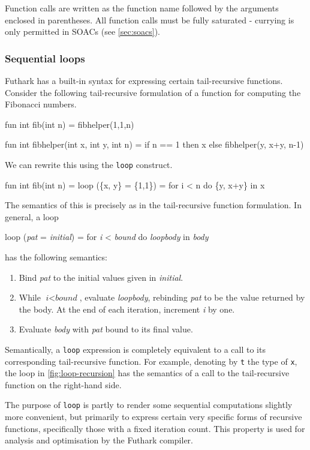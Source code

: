 \documentclass[oneside]{memoir}
\begin{document}
Function calls are written as the function name followed by the
arguments enclosed in parentheses.  All function calls must be fully
saturated - currying is only permitted in SOACs (see
\cref{sec:soacs}).

\subsubsection{Sequential loops}
\label{sec:sequential-loops}

Futhark has a built-in syntax for expressing certain tail-recursive
functions.  Consider the following tail-recursive formulation of a
function for computing the Fibonacci numbers.
\begin{colorcode}
  fun int fib(int n) = fibhelper(1,1,n)

  fun int fibhelper(int x, int y, int n) =
    if n == 1 then x else fibhelper(y, x+y, n-1)
\end{colorcode}
We can rewrite this using the \texttt{loop} construct.
\begin{colorcode}
  fun int fib(int n) =
    loop (\{x, y\} = \{1,1\}) = for i < n do
                              \{y, x+y\}
    in x
\end{colorcode}
The semantics of this is precisely as in the tail-recursive function
formulation.  In general, a loop
\begin{colorcode}
  loop (\emph{pat} = \emph{initial}) = for \emph{i} < \emph{bound} do \emph{loopbody}
  in \emph{body}
\end{colorcode}
has the following semantics:

\begin{enumerate}
  \item Bind \textit{pat} to the initial values given in \textit{initial}.
  \item While $\textit{i} < \textit{bound}$, evaluate
    \textit{loopbody}, rebinding \textit{pat} to be the value returned
    by the body.  At the end of each iteration, increment \textit{i}
    by one.
  \item Evaluate \textit{body} with \textit{pat} bound to its final
    value.
\end{enumerate}
Semantically, a \texttt{loop} expression is completely equivalent to a
call to its corresponding tail-recursive function.  For example,
denoting by \texttt{t} the type of \texttt{x}, the loop in
\cref{fig:loop-recursion} has the semantics of a call to the
tail-recursive function on the right-hand side.

The purpose of \texttt{loop} is partly to render some sequential
computations slightly more convenient, but primarily to express
certain very specific forms of recursive functions, specifically those
with a fixed iteration count.  This property is used for analysis and
optimisation by the Futhark compiler.
\end{document}
